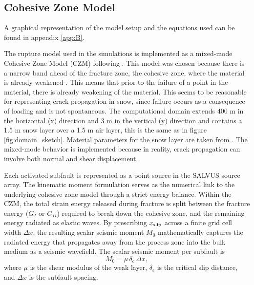 \subsection{Cohesive Zone Model}
\label{sec:czm_methods}

A graphical representation of the model setup and the equations used can be found in appendix \ref{app:B}.

The rupture model used in the simulations is implemented as a mixed-mode Cohesive Zone Model (CZM) following \cite{mahajanModelingInterfacialCrack2008}. This model was chosen because there is a narrow band ahead of the fracture zone, the cohesive zone, where the material is already weakened \parencite{mahajanModelingInterfacialCrack2008}. This means that prior to the failure of a point in the material, there is already weakening of the material. This seems to be reasonable for representing crack propagation in snow, since failure occurs as a consequence of loading and is not spontaneous. The computational domain extends 400 m in the horizontal (x) direction and 3 m in the vertical (y) direction and contains a 1.5 m snow layer over a 1.5 m air layer, this is the same as in figure \ref{fig:domain_sketch}. Material parameters for the snow layer are taken from \cite{guillemotEffectSnowfallChanges2021}. The mixed-mode behavior is implemented because in reality, crack propagation can involve both normal and shear displacement.  \par

Each activated subfault is represented as a point source in the SALVUS source array. The kinematic moment formulation serves as the numerical link to the underlying cohesive zone model through a strict energy balance. Within the CZM, the total strain energy released during fracture is split between the fracture energy ($G_I$ or $G_{II}$) required to break down the cohesive zone, and the remaining energy radiated as elastic waves. By prescribing $x_{\rm slip}$ across a finite grid cell width $\Delta x$, the resulting scalar seismic moment $M_0$ mathematically captures the  radiated energy that propagates away from the process zone into the bulk medium as a seismic wavefield. The scalar seismic moment per subfault is
\begin{equation}
    M_0 = \mu\,\delta_c\,\Delta x,
\end{equation}
where $\mu$ is the shear modulus of the weak layer, $\delta_c$ is the critical slip distance, and $\Delta x$ is the subfault spacing. \par


